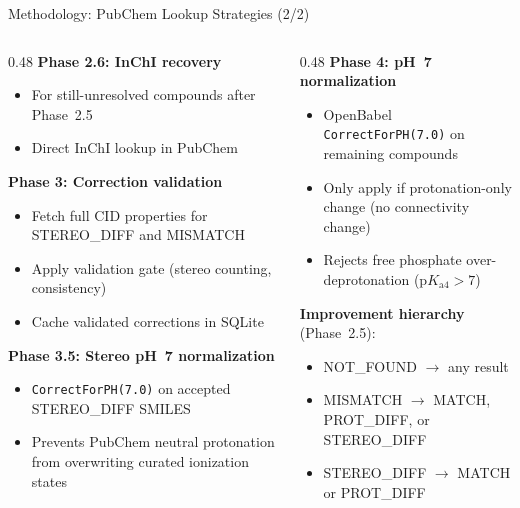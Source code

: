 \documentclass[aspectratio=169,11pt]{beamer}
\begin{document}
\begin{frame}{Methodology: PubChem Lookup Strategies (2/2)}
\small
\begin{columns}[T]
\begin{column}{0.48\textwidth}
\textbf{Phase 2.6: InChI recovery}\footnotesize
\begin{itemize}\setlength\itemsep{0pt}
  \item For still-unresolved compounds after Phase~2.5
  \item Direct InChI lookup in PubChem
\end{itemize}

\small\textbf{Phase 3: Correction validation}\footnotesize
\begin{itemize}\setlength\itemsep{0pt}
  \item Fetch full CID properties for STEREO\_DIFF and MISMATCH
  \item Apply validation gate (stereo counting, consistency)
  \item Cache validated corrections in SQLite
\end{itemize}

\small\textbf{Phase 3.5: Stereo pH~7 normalization}\footnotesize
\begin{itemize}\setlength\itemsep{0pt}
  \item \texttt{CorrectForPH(7.0)} on accepted STEREO\_DIFF SMILES
  \item Prevents PubChem neutral protonation from overwriting
        curated ionization states
\end{itemize}
\end{column}

\begin{column}{0.48\textwidth}
\textbf{Phase 4: pH~7 normalization}\footnotesize
\begin{itemize}\setlength\itemsep{0pt}
  \item OpenBabel \texttt{CorrectForPH(7.0)} on remaining compounds
  \item Only apply if protonation-only change (no connectivity change)
  \item Rejects free phosphate over-deprotonation ($\text{p}K_{\text{a}4}{>}7$)
\end{itemize}

\small\textbf{Improvement hierarchy} (Phase~2.5):\footnotesize
\begin{itemize}\setlength\itemsep{0pt}
  \item NOT\_FOUND $\to$ any result
  \item MISMATCH $\to$ MATCH, PROT\_DIFF, or STEREO\_DIFF
  \item STEREO\_DIFF $\to$ MATCH or PROT\_DIFF
\end{itemize}
\end{column}
\end{columns}

\end{frame}
\end{document}
